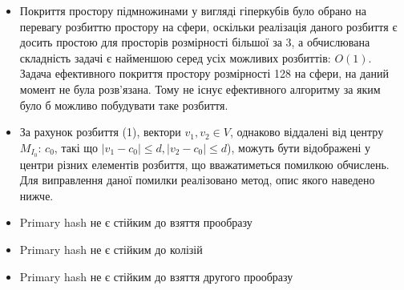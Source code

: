 \documentclass[11pt]{article}
\providecommand{\tightlist}{%
      \setlength{\itemsep}{0pt}\setlength{\parskip}{0pt}}
\begin{document}
\begin{itemize}
\begin{itemize}
    \begin{itemize}
    \tightlist
    \item
      Покриття простору підмножинами у вигляді гіперкубів було обрано на
      перевагу розбиттю простору на сфери, оскільки реалізація даного
      розбиття є досить простою для просторів розмірності більшої за 3,
      а обчислювана складність задачі є найменшою серед усіх можливих
      розбиттів: \(O(1)\). Задача ефективного покриття простору
      розмірності 128 на сфери, на даний момент не була розв'язана. Тому
      не існує ефективного алгоритму за яким було б можливо побудувати
      таке розбиття.
    \item
      За рахунок розбиття (1), вектори \(v_1,v_2 \in V\), однаково
      віддалені від центру \(M_{I_0}\): \(c_0\), такі що
      \(|v_1-c_0|\leq d,|v_2-c_0|\leq d\)), можуть бути відображені у
      центри різних елементів розбиття, що вважатиметься помилкою
      обчислень. Для виправлення даної помилки реалізовано метод, опис
      якого наведено нижче.
    \item
      Primary hash не є стійким до взяття прообразу
    \item
      Primary hash не є стійким до колізій
    \item
      Primary hash не є стійким до взяття другого прообразу
    \end{itemize}
  \end{itemize}
\end{itemize}
\end{document}
